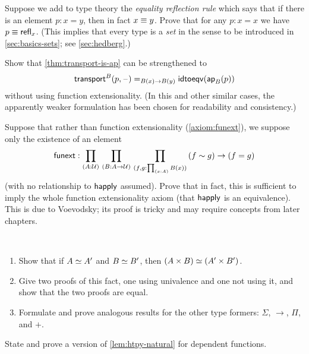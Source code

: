 \begin{ex}\label{ex:equality-reflection}
Suppose we add to type theory the \emph{equality reflection rule} which says that if there is an element $p:x=y$, then in fact $x\equiv y$.
Prove that for any $p:x=x$ we have $p\equiv \mathsf{refl}_{x}$.
(This implies that every type is a \emph{set} in the sense to be introduced in \cref{sec:basics-sets}; see \cref{sec:hedberg}.)
\end{ex}

\begin{ex}\label{ex:strengthen-transport-is-ap}
Show that \cref{thm:transport-is-ap} can be strengthened to
\[\mathsf{transport}^{B}(p,{\mathord{\hspace{1pt}\text{--}\hspace{1pt}}}) =_{B(x)\to B(y)} \mathsf{idtoeqv}(\mathsf{ap}_{B}(p))\]
without using function extensionality.
(In this and other similar cases, the apparently weaker formulation has been chosen for readability and consistency.)
\end{ex}

\begin{ex}\label{ex:strong-from-weak-funext}
Suppose that rather than function extensionality (\cref{axiom:funext}), we suppose only the existence of an element
\[ \funext : \prd{A:\UU}{B:A\to \UU}{f,g:\prd{x:A} B(x)} (f\htpy g) \to (f=g) \]
(with no relationship to $\mathsf{happly}$ assumed).
Prove that in fact, this is sufficient to imply the whole function extensionality axiom (that $\mathsf{happly}$ is an equivalence).
This is due to Voevodsky; its proof is tricky and may require concepts from later chapters.
\end{ex}

\begin{ex}\label{ex:equiv-functor-types}\
\begin{enumerate}
    \item Show that if $A \simeq A'$  and $B \simeq B'$, then $(A\times B) \simeq (A'\times B')$.
    \item Give two proofs of this fact, one using univalence and one not using it, and show that the two proofs are equal.
    \item Formulate and prove analogous results for the other type formers: $\Sigma$, $\to$, $\Pi$, and $+$.
\end{enumerate}
\end{ex}

\begin{ex}\label{ex:dep-htpy-natural}
State and prove a version of \cref{lem:htpy-natural} for dependent functions.
\end{ex}